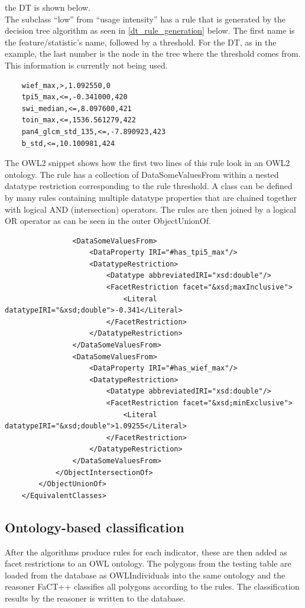 \documentclass[authoryear, review,12pt,number]{elsarticle}
\begin{document}
the DT is shown below.
\\
The subclass ``low'' from ``usage intensity'' has a rule that is generated by
the decision tree algorithm as seen in \ref{dt_rule_generation} below. The first
name is the feature/statistic's name, followed by a threshold. For the DT, as in
the example, the last number is the node in the tree where the threshold comes
from. This information is currently not being used.
\label{dt_rule_snippet_csv}
\begin{lstlisting}
    wief_max,>,1.092550,0
    tpi5_max,<=,-0.341000,420
    swi_median,<=,8.097600,421
    toin_max,<=,1536.561279,422
    pan4_glcm_std_135,<=,-7.890923,423
    b_std,<=,10.100981,424
\end{lstlisting}
The OWL2 snippet shows how the first two lines of this rule look in an OWL2 
ontology. The rule has a collection of DataSomeValuesFrom within a nested 
datatype restriction corresponding to the rule threshold. A class can be 
defined by many rules containing multiple datatype properties that are chained 
together with logical AND (intersection) operators. The rules are then joined 
by a logical OR operator as can be seen in the outer ObjectUnionOf.  
\label{dt_rule_snippet_owl}
\begin{lstlisting}
                <DataSomeValuesFrom>
                    <DataProperty IRI="#has_tpi5_max"/>
                    <DatatypeRestriction>
                        <Datatype abbreviatedIRI="xsd:double"/>
                        <FacetRestriction facet="&xsd;maxInclusive">
                            <Literal datatypeIRI="&xsd;double">-0.341</Literal>
                        </FacetRestriction>
                    </DatatypeRestriction>
                </DataSomeValuesFrom>
                <DataSomeValuesFrom>
                    <DataProperty IRI="#has_wief_max"/>
                    <DatatypeRestriction>
                        <Datatype abbreviatedIRI="xsd:double"/>
                        <FacetRestriction facet="&xsd;minExclusive">
                            <Literal datatypeIRI="&xsd;double">1.09255</Literal>
                        </FacetRestriction>
                    </DatatypeRestriction>
                </DataSomeValuesFrom>
            </ObjectIntersectionOf>
        </ObjectUnionOf>
    </EquivalentClasses>
\end{lstlisting}
\subsection{Ontology-based classification}
\label{subsec:onto_classification}
After the algorithms produce rules for each indicator, these are then added as
facet restrictions to an OWL ontology. The polygons from the testing table are
loaded from the database as OWLIndividuals into the same ontology and the
reasoner FaCT++ classifies all polygons according to the rules. The
classification results by the reasoner is written to the database.
\end{document}
